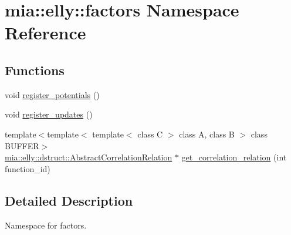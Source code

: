 \hypertarget{namespacemia_1_1elly_1_1factors}{\section{mia\-:\-:elly\-:\-:factors Namespace Reference}
\label{namespacemia_1_1elly_1_1factors}
}
\subsection*{Functions}
\begin{DoxyCompactItemize}
\item 
void \hyperlink{namespacemia_1_1elly_1_1factors_a1e408cecf7e7bdba69d9ce1bb78b5ec0}{register\-\_\-potentials} ()
\item 
void \hyperlink{namespacemia_1_1elly_1_1factors_a3b2e7562146e4d807ec2855fccbc8282}{register\-\_\-updates} ()
\item 
{\footnotesize template$<$template$<$ template$<$ class C $>$ class A, class B $>$ class B\-U\-F\-F\-E\-R$>$ }\\\hyperlink{classmia_1_1elly_1_1dstruct_1_1_abstract_correlation_relation}{mia\-::elly\-::dstruct\-::\-Abstract\-Correlation\-Relation} $\ast$ \hyperlink{namespacemia_1_1elly_1_1factors_a52975b837a6ff295ebe531bca52168f1}{get\-\_\-correlation\-\_\-relation} (int function\-\_\-id)
\end{DoxyCompactItemize}


\subsection{Detailed Description}
Namespace for factors. 

